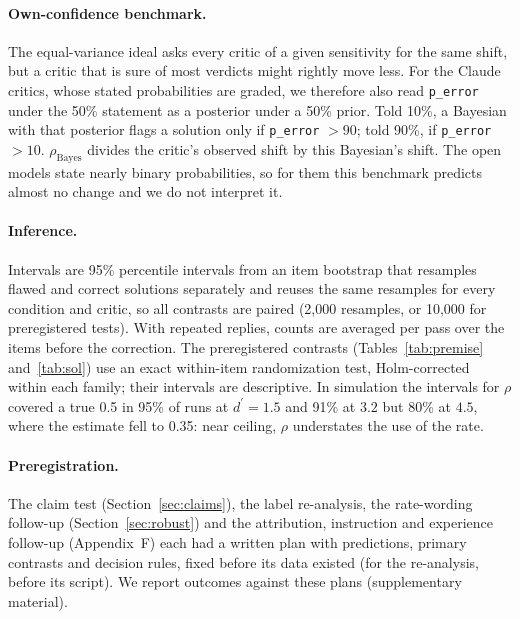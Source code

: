 \documentclass[letterpaper]{article} %
\newcommand{\dprime}{d^{\prime}}
\begin{document}
\paragraph{Own-confidence benchmark.} The equal-variance ideal asks every critic of a given sensitivity for the same shift, but a critic that is sure of most verdicts might rightly move less. For the Claude critics, whose stated probabilities are graded, we therefore also read \texttt{p\_error} under the 50\% statement as a posterior under a 50\% prior. Told 10\%, a Bayesian with that posterior flags a solution only if \texttt{p\_error} $>90$; told 90\%, if \texttt{p\_error} $>10$. $\rho_{\mathrm{Bayes}}$ divides the critic's observed shift by this Bayesian's shift. The open models state nearly binary probabilities, so for them this benchmark predicts almost no change and we do not interpret it.

\paragraph{Inference.} Intervals are 95\% percentile intervals from an item bootstrap that resamples flawed and correct solutions separately and reuses the same resamples for every condition and critic, so all contrasts are paired (2,000 resamples, or 10,000 for preregistered tests). With repeated replies, counts are averaged per pass over the items before the correction. The preregistered contrasts (Tables~\ref{tab:premise} and~\ref{tab:sol}) use an exact within-item randomization test, Holm-corrected within each family; their intervals are descriptive. In simulation the intervals for $\rho$ covered a true 0.5 in 95\% of runs at $\dprime=1.5$ and 91\% at $3.2$ but 80\% at $4.5$, where the estimate fell to 0.35: near ceiling, $\rho$ understates the use of the rate.

\paragraph{Preregistration.} The claim test (Section~\ref{sec:claims}), the label re-analysis, the rate-wording follow-up (Section~\ref{sec:robust}) and the attribution, instruction and experience follow-up (Appendix~F) each had a written plan with predictions, primary contrasts and decision rules, fixed before its data existed (for the re-analysis, before its script). We report outcomes against these plans (supplementary material).

\end{document}
